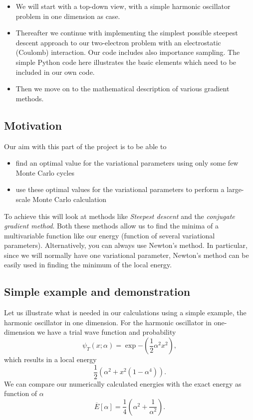 \documentclass[%
oneside,                 %
final,                   %
10pt]{article}
\begin{document}
\begin{itemize}
\item We will start with a top-down view, with a simple harmonic oscillator problem in one dimension as case.

\item Thereafter we continue with implementing the simplest possible steepest descent approach to our two-electron problem with an electrostatic (Coulomb) interaction. Our code includes also importance sampling. The simple Python code here illustrates the basic elements which need to be included in our own code.

\item Then we move on to the mathematical description of various gradient methods.
\end{itemize}

\noindent
\subsection*{Motivation}

Our aim with this part of the project is to be able to
\begin{itemize}
\item find an optimal value for the variational parameters using only some few Monte Carlo cycles

\item use these optimal values for the variational parameters to perform a large-scale Monte Carlo calculation
\end{itemize}

\noindent
To achieve this will look at methods like \emph{Steepest descent} and the \emph{conjugate gradient method}. Both these methods allow us to find
the minima of a multivariable  function like our energy (function of several variational parameters). 
Alternatively, you can always use Newton's method. In particular, since we will normally have one variational parameter,
Newton's method can be easily used in finding the minimum of the local energy.


\subsection*{Simple example and demonstration}

Let us illustrate what is needed in our calculations using a simple example, the harmonic oscillator in one dimension.
For the harmonic oscillator in one-dimension we have a  trial wave function and probability
\[
\psi_T(x;\alpha) = \exp{-(\frac{1}{2}\alpha^2x^2)},
\]
which results in a local energy 
\[
\frac{1}{2}\left(\alpha^2+x^2(1-\alpha^4)\right).
\]
We can compare our numerically calculated energies with the exact energy as function of $\alpha$
\[
\overline{E}[\alpha] = \frac{1}{4}\left(\alpha^2+\frac{1}{\alpha^2}\right).
\]
\end{document}
